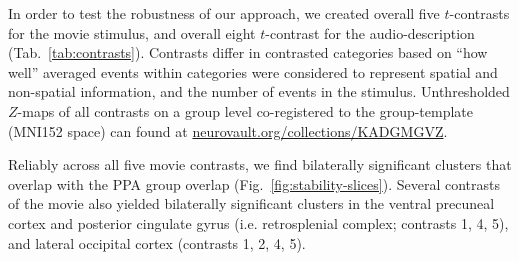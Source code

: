 \documentclass[english]{article}
\begin{document}


In order to test the robustness of our approach, we created overall five
$t$-contrasts for the movie stimulus, and overall eight $t$-contrast for the
audio-description (Tab.~\ref{tab:contrasts}).
Contrasts differ in contrasted categories based on ``how well'' averaged events
within categories were considered to represent spatial and non-spatial
information, and the number of events in the stimulus.
Unthresholded $Z$-maps of all contrasts on a group level co-registered to the
group-template (MNI152 space) can found at
\href{https://neurovault.org/collections/KADGMGVZ/}{\url{neurovault.org/collections/KADGMGVZ}}.


Reliably across all five movie contrasts, we find bilaterally significant
clusters that overlap with the PPA group overlap
(Fig.~\ref{fig:stability-slices}).
Several contrasts of the movie also yielded bilaterally significant clusters in
the ventral precuneal cortex and posterior cingulate gyrus (i.e. retrosplenial
complex; contrasts 1, 4, 5), and lateral occipital cortex (contrasts 1, 2, 4,
5).

\end{document}
